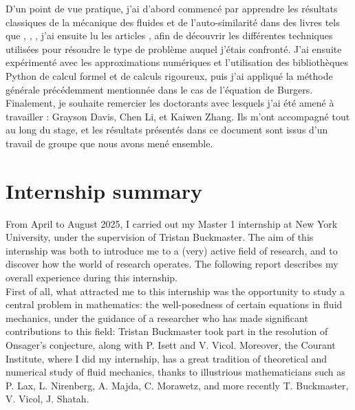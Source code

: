 \documentclass[11pt,a4paper]{article}
\begin{document}
\hspace*{2em} D'un point de vue pratique, j'ai d'abord commencé par apprendre les résultats classiques de la mécanique des fluides et de l'auto-similarité dans des livres tels que \cite{majda2001vorticity}, \cite{eggers2015singularities}, \cite{tao2006dispersive}, j'ai ensuite lu les articles \cite{buckmaster2019formation},\cite{buckmaster2022imploding} afin de découvrir les différentes techniques utilisées pour résoudre le type de problème auquel j'étais confronté. J'ai ensuite expérimenté avec les approximations numériques et l'utilisation des bibliothèques Python de calcul formel et de calculs rigoureux, puis j'ai appliqué la méthode générale précédemment mentionnée dans le cas de l'équation de Burgers. \\

\hspace*{2em} Finalement, je souhaite remercier les doctorants avec lesquels j'ai été amené à travailler : Grayson Davis, Chen Li, et Kaiwen Zhang. Ils m'ont accompagné tout au long du stage, et les résultats présentés dans ce document sont issus d'un travail de groupe que nous avons mené ensemble.

\newpage
{\centering
\section*{Internship summary}
}
\hspace*{2em} From April to August 2025, I carried out my Master 1 internship at New York University, under the supervision of Tristan Buckmaster. The aim of this internship was both to introduce me to a (very) active field of research, and to discover how the world of research operates. The following report describes my overall experience during this internship. \\

\hspace*{2em} First of all, what attracted me to this internship was the opportunity to study a central problem in mathematics: the well-posedness of certain equations in fluid mechanics, under the guidance of a researcher who has made significant contributions to this field: Tristan Buckmaster took part in the resolution of Onsager’s conjecture, along with P. Isett and V. Vicol. Moreover, the Courant Institute, where I did my internship, has a great tradition of theoretical and numerical study of fluid mechanics, thanks to illustrious mathematicians such as P. Lax, L. Nirenberg, A. Majda, C. Morawetz, and more recently T. Buckmaster, V. Vicol, J. Shatah. \\
\end{document}

